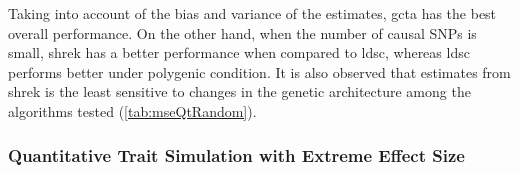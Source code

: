 \documentclass[12pt]{scrbook}
\begin{document}
Taking into account of the bias and variance of the estimates, \gls{gcta} has the best overall performance.
On the other hand, when the number of causal \glspl{SNP} is small, \gls{shrek} has a better performance when compared to \gls{ldsc}, whereas \gls{ldsc} performs better under polygenic condition.
It is also observed that estimates from \gls{shrek} is the least sensitive to changes in the genetic architecture among the algorithms tested (\cref{tab:mseQtRandom}).  

\subsubsection{Quantitative Trait Simulation with Extreme Effect Size}
\begin{figure}
	\centering
	\subfloat[GCTA]{
}
\end{figure}
\end{document}
